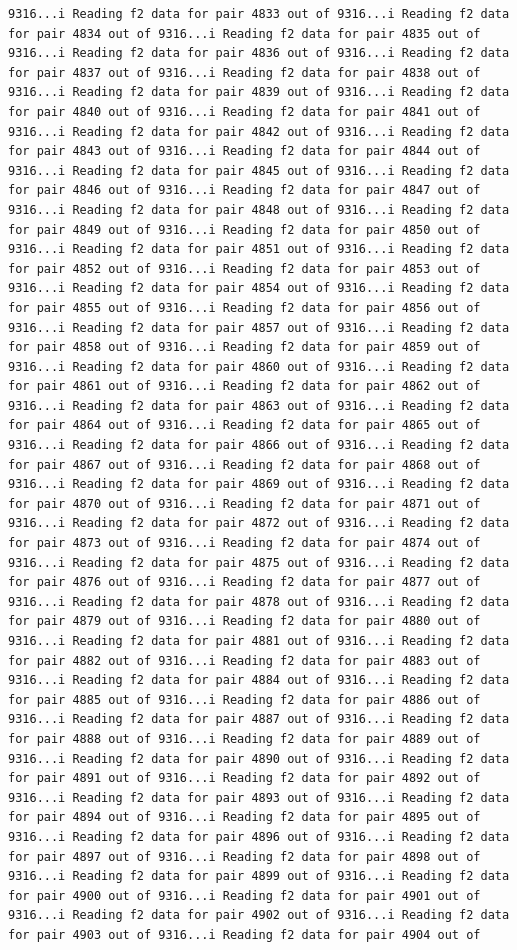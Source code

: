 \documentclass[
]{article}
\begin{document}
\begin{verbatim}
9316...i Reading f2 data for pair 4833 out of 9316...i Reading f2 data for pair 4834 out of 9316...i Reading f2 data for pair 4835 out of 9316...i Reading f2 data for pair 4836 out of 9316...i Reading f2 data for pair 4837 out of 9316...i Reading f2 data for pair 4838 out of 9316...i Reading f2 data for pair 4839 out of 9316...i Reading f2 data for pair 4840 out of 9316...i Reading f2 data for pair 4841 out of 9316...i Reading f2 data for pair 4842 out of 9316...i Reading f2 data for pair 4843 out of 9316...i Reading f2 data for pair 4844 out of 9316...i Reading f2 data for pair 4845 out of 9316...i Reading f2 data for pair 4846 out of 9316...i Reading f2 data for pair 4847 out of 9316...i Reading f2 data for pair 4848 out of 9316...i Reading f2 data for pair 4849 out of 9316...i Reading f2 data for pair 4850 out of 9316...i Reading f2 data for pair 4851 out of 9316...i Reading f2 data for pair 4852 out of 9316...i Reading f2 data for pair 4853 out of 9316...i Reading f2 data for pair 4854 out of 9316...i Reading f2 data for pair 4855 out of 9316...i Reading f2 data for pair 4856 out of 9316...i Reading f2 data for pair 4857 out of 9316...i Reading f2 data for pair 4858 out of 9316...i Reading f2 data for pair 4859 out of 9316...i Reading f2 data for pair 4860 out of 9316...i Reading f2 data for pair 4861 out of 9316...i Reading f2 data for pair 4862 out of 9316...i Reading f2 data for pair 4863 out of 9316...i Reading f2 data for pair 4864 out of 9316...i Reading f2 data for pair 4865 out of 9316...i Reading f2 data for pair 4866 out of 9316...i Reading f2 data for pair 4867 out of 9316...i Reading f2 data for pair 4868 out of 9316...i Reading f2 data for pair 4869 out of 9316...i Reading f2 data for pair 4870 out of 9316...i Reading f2 data for pair 4871 out of 9316...i Reading f2 data for pair 4872 out of 9316...i Reading f2 data for pair 4873 out of 9316...i Reading f2 data for pair 4874 out of 9316...i Reading f2 data for pair 4875 out of 9316...i Reading f2 data for pair 4876 out of 9316...i Reading f2 data for pair 4877 out of 9316...i Reading f2 data for pair 4878 out of 9316...i Reading f2 data for pair 4879 out of 9316...i Reading f2 data for pair 4880 out of 9316...i Reading f2 data for pair 4881 out of 9316...i Reading f2 data for pair 4882 out of 9316...i Reading f2 data for pair 4883 out of 9316...i Reading f2 data for pair 4884 out of 9316...i Reading f2 data for pair 4885 out of 9316...i Reading f2 data for pair 4886 out of 9316...i Reading f2 data for pair 4887 out of 9316...i Reading f2 data for pair 4888 out of 9316...i Reading f2 data for pair 4889 out of 9316...i Reading f2 data for pair 4890 out of 9316...i Reading f2 data for pair 4891 out of 9316...i Reading f2 data for pair 4892 out of 9316...i Reading f2 data for pair 4893 out of 9316...i Reading f2 data for pair 4894 out of 9316...i Reading f2 data for pair 4895 out of 9316...i Reading f2 data for pair 4896 out of 9316...i Reading f2 data for pair 4897 out of 9316...i Reading f2 data for pair 4898 out of 9316...i Reading f2 data for pair 4899 out of 9316...i Reading f2 data for pair 4900 out of 9316...i Reading f2 data for pair 4901 out of 9316...i Reading f2 data for pair 4902 out of 9316...i Reading f2 data for pair 4903 out of 9316...i Reading f2 data for pair 4904 out of 
\end{verbatim}
\end{document}
